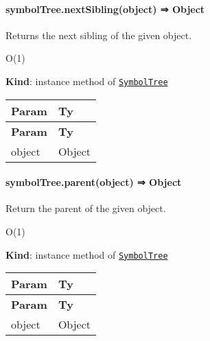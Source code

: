 \label{_module_symbol-tree--SymbolTree+nextSibling}%


\paragraph*{symbol\+Tree.\+next\+Sibling(object) ⇒ {\ttfamily Object}}

Returns the next sibling of the given object.


\begin{DoxyItemize}
\item {\ttfamily O(1)}
\end{DoxyItemize}

{\bfseries Kind}\+: instance method of {\ttfamily \href{#exp_module_symbol-tree--SymbolTree}{\tt Symbol\+Tree}}

\tabulinesep=1mm
\begin{longtabu} spread 0pt [c]{*{2}{|X[-1]}|}
\hline
\rowcolor{\tableheadbgcolor}\textbf{ Param  }&\textbf{ Ty   }\\
\endfirsthead
\hline
\endfoot
\hline
\rowcolor{\tableheadbgcolor}\textbf{ Param  }&\textbf{ Ty   }\\
\endhead
object  &{\ttfamily Object}   \\
\end{longtabu}


\label{_module_symbol-tree--SymbolTree+parent}%


\paragraph*{symbol\+Tree.\+parent(object) ⇒ {\ttfamily Object}}

Return the parent of the given object.


\begin{DoxyItemize}
\item {\ttfamily O(1)}
\end{DoxyItemize}

{\bfseries Kind}\+: instance method of {\ttfamily \href{#exp_module_symbol-tree--SymbolTree}{\tt Symbol\+Tree}}

\tabulinesep=1mm
\begin{longtabu} spread 0pt [c]{*{2}{|X[-1]}|}
\hline
\rowcolor{\tableheadbgcolor}\textbf{ Param  }&\textbf{ Ty   }\\
\endfirsthead
\hline
\endfoot
\hline
\rowcolor{\tableheadbgcolor}\textbf{ Param  }&\textbf{ Ty   }\\
\endhead
object  &{\ttfamily Object}   \\
\end{longtabu}


